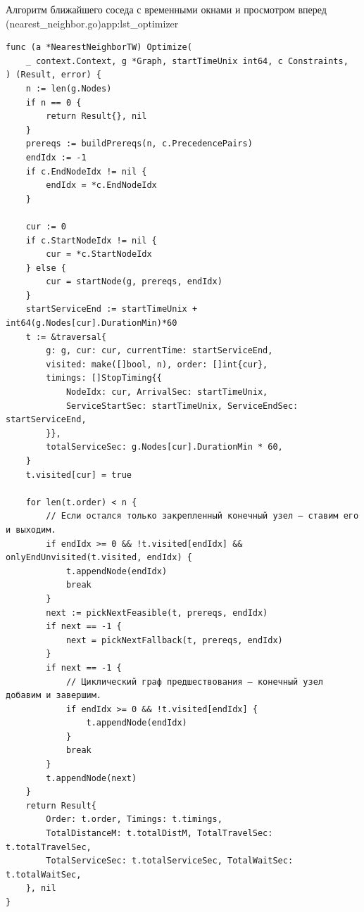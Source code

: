 \begin{codelisting}{Алгоритм ближайшего соседа с временными окнами и просмотром вперед (nearest\_neighbor.go)}{app:lst_optimizer}
\begin{verbatim}
func (a *NearestNeighborTW) Optimize(
    _ context.Context, g *Graph, startTimeUnix int64, c Constraints,
) (Result, error) {
    n := len(g.Nodes)
    if n == 0 {
        return Result{}, nil
    }
    prereqs := buildPrereqs(n, c.PrecedencePairs)
    endIdx := -1
    if c.EndNodeIdx != nil {
        endIdx = *c.EndNodeIdx
    }

    cur := 0
    if c.StartNodeIdx != nil {
        cur = *c.StartNodeIdx
    } else {
        cur = startNode(g, prereqs, endIdx)
    }
    startServiceEnd := startTimeUnix + int64(g.Nodes[cur].DurationMin)*60
    t := &traversal{
        g: g, cur: cur, currentTime: startServiceEnd,
        visited: make([]bool, n), order: []int{cur},
        timings: []StopTiming{{
            NodeIdx: cur, ArrivalSec: startTimeUnix,
            ServiceStartSec: startTimeUnix, ServiceEndSec: startServiceEnd,
        }},
        totalServiceSec: g.Nodes[cur].DurationMin * 60,
    }
    t.visited[cur] = true

    for len(t.order) < n {
        // Если остался только закрепленный конечный узел — ставим его и выходим.
        if endIdx >= 0 && !t.visited[endIdx] && onlyEndUnvisited(t.visited, endIdx) {
            t.appendNode(endIdx)
            break
        }
        next := pickNextFeasible(t, prereqs, endIdx)
        if next == -1 {
            next = pickNextFallback(t, prereqs, endIdx)
        }
        if next == -1 {
            // Циклический граф предшествования — конечный узел добавим и завершим.
            if endIdx >= 0 && !t.visited[endIdx] {
                t.appendNode(endIdx)
            }
            break
        }
        t.appendNode(next)
    }
    return Result{
        Order: t.order, Timings: t.timings,
        TotalDistanceM: t.totalDistM, TotalTravelSec: t.totalTravelSec,
        TotalServiceSec: t.totalServiceSec, TotalWaitSec: t.totalWaitSec,
    }, nil
}


\end{verbatim}
\end{codelisting}
